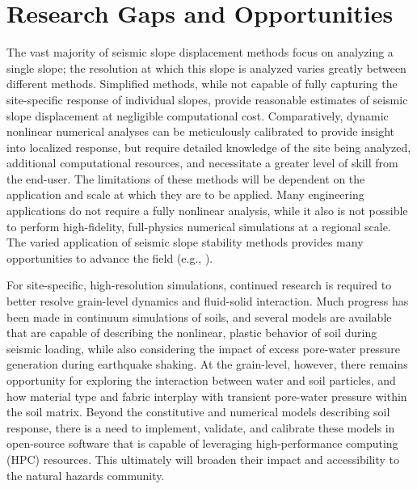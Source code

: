 \section{Research Gaps and Opportunities}
\label{sec:eq_landslide_research} 
The vast majority of seismic slope displacement methods focus on analyzing a single slope; the resolution at which this slope is analyzed varies greatly between different methods. Simplified methods, while not capable of fully capturing the site-specific response of individual slopes, provide reasonable estimates of seismic slope displacement at negligible computational cost. Comparatively, dynamic nonlinear numerical analyses can be meticulously calibrated to provide insight into localized response, but require detailed knowledge of the site being analyzed, additional computational resources, and necessitate a greater level of skill from the end-user. The limitations of these methods will be dependent on the application and scale at which they are to be applied. Many engineering applications do not require a fully nonlinear analysis, while it also is not possible to perform high-fidelity, full-physics numerical simulations at a regional scale. The varied application of seismic slope stability methods provides many opportunities to advance the field (e.g., \cite{bray2017new}).

For site-specific, high-resolution simulations, continued research is required to better resolve grain-level dynamics and fluid-solid interaction. Much progress has been made in continuum simulations of soils, and several models are available that are capable of describing the nonlinear, plastic behavior of soil during seismic loading, while also considering the impact of excess pore-water pressure generation during earthquake shaking. At the grain-level, however, there remains opportunity for exploring the interaction between water and soil particles, and how material type and fabric interplay with transient pore-water pressure within the soil matrix. Beyond the constitutive and numerical models describing soil response, there is a need to implement, validate, and calibrate these models in open-source software that is capable of leveraging high-performance computing (HPC) resources. This ultimately will broaden their impact and accessibility to the natural hazards community.

